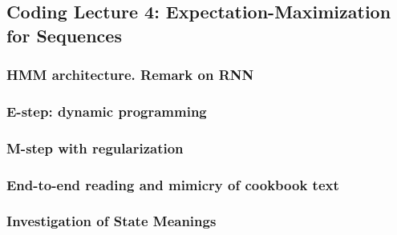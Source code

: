 \subsection*{Coding Lecture 4: Expectation-Maximization for Sequences}

\subsubsection*{HMM architecture.  Remark on RNN}
\subsubsection*{E-step: dynamic programming}
\subsubsection*{M-step with regularization}
\subsubsection*{End-to-end reading and mimicry of cookbook text}
\subsubsection*{Investigation of State Meanings}
